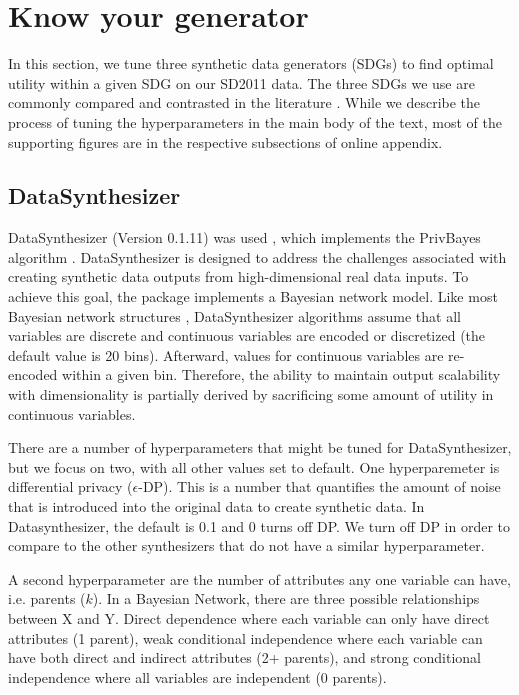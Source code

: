\documentclass[runningheads]{llncs}
\begin{document}
\section{Know your generator}\label{sec:know_your_generator}

In this section, we tune three synthetic data generators (SDGs) to find optimal utility within a given SDG on our SD2011 data.  The three SDGs we use are commonly compared and contrasted in the literature \cite{dankar2021fake,little2022comparing}.  While we describe the process of tuning the hyperparameters in the main body of the text, most of the supporting figures are in the respective subsections of online appendix.  

\subsection{DataSynthesizer}\label{subsec:know_your_generator_datasynthesizer}

DataSynthesizer (Version 0.1.11) was used \cite{ping2017datasynthesizer}, which implements the PrivBayes algorithm \cite{zhang2017privbayes}.  DataSynthesizer is designed to address the challenges associated with creating synthetic data outputs from high-dimensional real data inputs.  To achieve this goal, the package implements a Bayesian network model.  Like most Bayesian network structures \cite{chen2017learning}, DataSynthesizer algorithms assume that all variables are discrete and continuous variables are encoded or discretized (the default value is 20 bins).  Afterward, values for continuous variables are re-encoded within a given bin.  Therefore, the ability to maintain output scalability with dimensionality is partially derived by sacrificing some amount of utility in continuous variables.   

There are a number of hyperparameters that might be tuned for DataSynthesizer, but we focus on two, with all other values set to default.  One hyperparemeter is differential privacy ($\epsilon$-DP). This is a number that quantifies the amount of noise that is introduced into the original data to create synthetic data.  In Datasynthesizer, the default is 0.1 and 0 turns off DP.  We turn off DP in order to compare to the other synthesizers that do not have a similar hyperparameter.  

A second hyperparameter are the number of attributes any one variable can have, i.e. parents ($k$).  In a Bayesian Network, there are three possible relationships between X and Y.  Direct dependence where each variable can only have direct attributes (1 parent), weak conditional independence where each variable can have both direct and indirect attributes (2+ parents), and strong conditional independence where all variables are independent (0 parents).  
\end{document}
